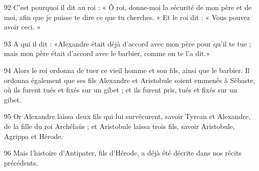 \par 92 C'est pourquoi il dit au roi : « Ô roi, donne-moi la sécurité de mon père et de moi, afin que je puisse te dire ce que tu cherches. » Et le roi dit : « Vous pouvez avoir ceci. »

\par 93 A qui il dit : «Alexandre était déjà d'accord avec mon père pour qu'il te tue ; mais mon père était d'accord avec le barbier, comme on te l'a dit.»

\par 94 Alors le roi ordonna de tuer ce vieil homme et son fils, ainsi que le barbier. Il ordonna également que ses fils Alexandre et Aristobule soient emmenés à Sébaste, où ils furent tués et fixés sur un gibet ; et ils furent pris, tués et fixés sur un gibet.

\par 95 Or Alexandre laissa deux fils qui lui survécurent, savoir Tyrcan et Alexandre, de la fille du roi Archélaüs ; et Aristobule laissa trois fils, savoir Aristobule, Agrippa et Hérode.

\par 96 Mais l'histoire d'Antipater, fils d'Hérode, a déjà été décrite dans nos récits précédents.

